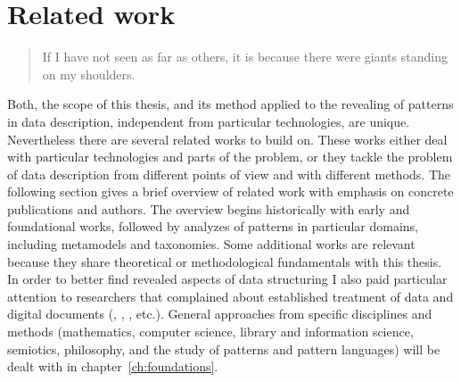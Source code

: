 \section{Related work}
\label{sec:relatedworks}

\begin{quotation}%
If I have not seen as far as others, it is because 
there were giants standing on my shoulders.
\\\quotationsource {}
\end{quotation}


\noindent Both, the scope of this thesis, and its method applied to the revealing
of patterns in data description, independent from particular technologies, are
unique. Nevertheless there are several related works to build on. These works
either deal with particular technologies and parts of the problem, or they
tackle the problem of data description from different points of view and with
different methods. The following section gives a brief overview of related work
with emphasis on concrete publications and authors.  The overview begins
historically with early and foundational works, followed by analyzes of
patterns in particular domains, including metamodels and taxonomies. Some
additional works are relevant because they share theoretical or methodological
fundamentals with this thesis. In order to better find revealed aspects of data
structuring I also paid particular attention to researchers that complained
about established treatment of data and digital documents
(, , , etc.).
General approaches from specific disciplines and methods (mathematics, computer
science, library and information science, semiotics, philosophy, and the study
of patterns and pattern languages) will be dealt with in
chapter~\ref{ch:foundations}.

